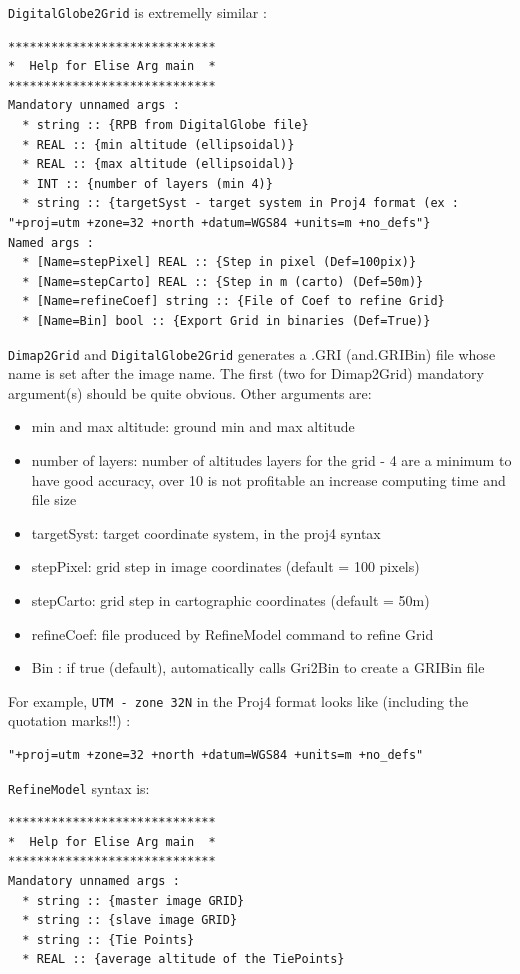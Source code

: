 {\tt DigitalGlobe2Grid} is extremelly similar :
\begin{verbatim}
*****************************
*  Help for Elise Arg main  *
*****************************
Mandatory unnamed args :
  * string :: {RPB from DigitalGlobe file}
  * REAL :: {min altitude (ellipsoidal)}
  * REAL :: {max altitude (ellipsoidal)}
  * INT :: {number of layers (min 4)}
  * string :: {targetSyst - target system in Proj4 format (ex : "+proj=utm +zone=32 +north +datum=WGS84 +units=m +no_defs"}
Named args :
  * [Name=stepPixel] REAL :: {Step in pixel (Def=100pix)}
  * [Name=stepCarto] REAL :: {Step in m (carto) (Def=50m)}
  * [Name=refineCoef] string :: {File of Coef to refine Grid}
  * [Name=Bin] bool :: {Export Grid in binaries (Def=True)}
 \end{verbatim}
 
{\tt Dimap2Grid} and {\tt DigitalGlobe2Grid} generates a .GRI (and.GRIBin) file whose name is set after the image name.
The first (two for Dimap2Grid) mandatory argument(s) should be quite obvious. Other arguments are:
\begin{itemize}
\item min and max altitude: ground min and max altitude
\item number of layers: number of altitudes layers for the grid - 4 are a minimum to have good accuracy, over 10 is not profitable an increase computing time and file size
\item targetSyst: target coordinate system, in the proj4 syntax
\item stepPixel: grid step in image coordinates (default = 100 pixels)
\item stepCarto: grid step in cartographic coordinates (default = 50m)
\item refineCoef: file produced by RefineModel command to refine Grid
\item Bin : if true (default), automatically calls Gri2Bin to create a GRIBin file
\end{itemize}


For example, {\tt UTM - zone 32N} in the Proj4 format looks like (including the quotation marks!!) :
\begin{verbatim}
"+proj=utm +zone=32 +north +datum=WGS84 +units=m +no_defs"
 \end{verbatim}
{\tt RefineModel} syntax is:

\begin{verbatim}
*****************************
*  Help for Elise Arg main  *
*****************************
Mandatory unnamed args :
  * string :: {master image GRID}
  * string :: {slave image GRID}
  * string :: {Tie Points}
  * REAL :: {average altitude of the TiePoints}
\end{verbatim}

